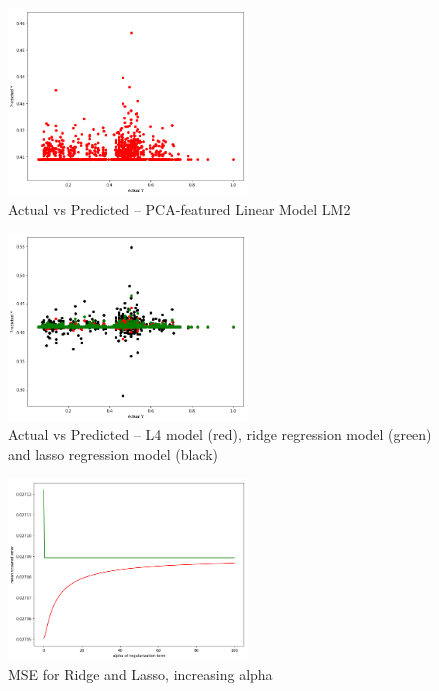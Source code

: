 \documentclass[10pt,twocolumn]{article}
\begin{document}
\begin{figure}[!t]
  \begin{center}
    \includegraphics[width=2.5in]{figure3.png}
  \end{center}

  \caption{\small Actual vs Predicted -- PCA-featured Linear Model LM2}
  \label{fig-3}
\end{figure}

\begin{figure}[!t]
  \begin{center}
    \includegraphics[width=2.5in]{figure4.png}
  \end{center}

  \caption{\small Actual vs Predicted -- L4 model (red), ridge regression model
  (green) and lasso regression model (black)}
  \label{fig-4}
\end{figure}

\begin{figure}[!t]
  \begin{center}
    \includegraphics[width=2.5in]{figure5.png}
  \end{center}

  \caption{\small MSE for Ridge and Lasso, increasing alpha}
  \label{fig-5}
\end{figure}
\end{document}
